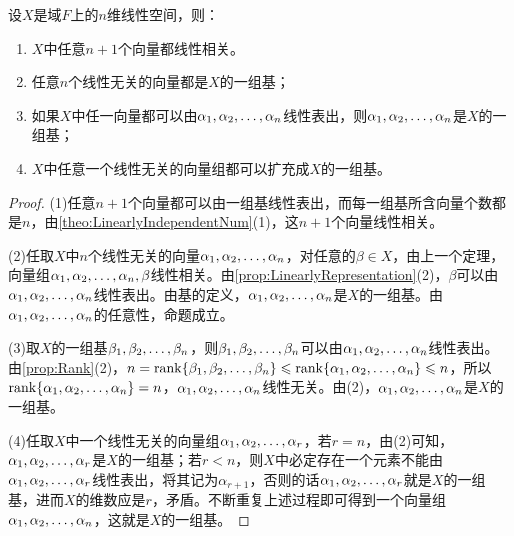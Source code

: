 \begin{property}\label{prop:nDimensionalLinearSpace}
	设$X$是域$F$上的$n$维线性空间，则：
	\begin{enumerate}
		\item $X$中任意$n+1$个向量都线性相关。
		\item 任意$n$个线性无关的向量都是$X$的一组基；
		\item 如果$X$中任一向量都可以由$\alpha_1, \alpha_2, \dots, \alpha_{n}$线性表出，则$\alpha_1, \alpha_2, \dots, \alpha_{n}$是$X$的一组基；
		\item $X$中任意一个线性无关的向量组都可以扩充成$X$的一组基。
	\end{enumerate}
\end{property}
\begin{proof}
	(1)任意$n+1$个向量都可以由一组基线性表出，而每一组基所含向量个数都是$n$，由\cref{theo:LinearlyIndependentNum}(1)，这$n+1$个向量线性相关。\par
	(2)任取$X$中$n$个线性无关的向量$\alpha_1, \alpha_2, \dots, \alpha_{n}$，对任意的$\beta\in X$，由上一个定理，向量组$\alpha_1, \alpha_2, \dots, \alpha_{n},\beta$线性相关。由\cref{prop:LinearlyRepresentation}(2)，$\beta$可以由$\alpha_1, \alpha_2, \dots, \alpha_{n}$线性表出。由基的定义，$\alpha_1, \alpha_2, \dots, \alpha_{n}$是$X$的一组基。由$\alpha_1, \alpha_2, \dots, \alpha_{n}$的任意性，命题成立。\par
	(3)取$X$的一组基$\beta_1, \beta_2, \dots, \beta_{n}$，则$\beta_1, \beta_2, \dots, \beta_{n}$可以由$\alpha_1, \alpha_2, \dots, \alpha_{n}$线性表出。由\cref{prop:Rank}(2)，$n=\operatorname{rank}\{\beta_1, \beta_2, \dots, \beta_{n}\}\leqslant\operatorname{rank}\{\alpha_1, \alpha_2, \dots, \alpha_{n}\}\leqslant n$，所以$\operatorname{rank}\{\alpha_1, \alpha_2, \dots, \alpha_{n}\}=n$，$\alpha_1, \alpha_2, \dots, \alpha_{n}$线性无关。由(2)，$\alpha_1, \alpha_2, \dots, \alpha_{n}$是$X$的一组基。\par
	(4)任取$X$中一个线性无关的向量组$\alpha_1, \alpha_2, \dots, \alpha_{r}$，若$r=n$，由(2)可知，$\alpha_1, \alpha_2, \dots, \alpha_{r}$是$X$的一组基；若$r<n$，则$X$中必定存在一个元素不能由$\alpha_1, \alpha_2, \dots, \alpha_{r}$线性表出，将其记为$\alpha_{r+1}$，否则的话$\alpha_1, \alpha_2, \dots, \alpha_{r}$就是$X$的一组基，进而$X$的维数应是$r$，矛盾。不断重复上述过程即可得到一个向量组$\alpha_1, \alpha_2, \dots, \alpha_{n}$，这就是$X$的一组基。
\end{proof}
